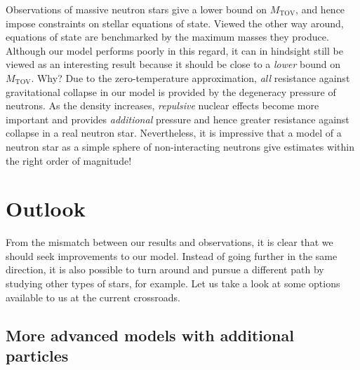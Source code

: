 Observations of massive neutron stars give a lower bound on $M_\text{TOV}$, and hence impose constraints on stellar equations of state.
Viewed the other way around, equations of state are benchmarked by the maximum masses they produce.
Although our model performs poorly in this regard, it can in hindsight still be viewed as an interesting result because it should be close to a \emph{lower} bound on $M_\text{TOV}$.
Why?
Due to the zero-temperature approximation, \emph{all} resistance against gravitational collapse in our model is provided by the degeneracy pressure of neutrons.
As the density increases, \emph{repulsive} nuclear effects become more important and provides \emph{additional} pressure and hence greater resistance against collapse in a real neutron star. \cite[section 3.9.8]{ref:glendenning}
Nevertheless, it is impressive that a model of a neutron star as a simple sphere of non-interacting neutrons give estimates within the right order of magnitude!

\section{Outlook}

From the mismatch between our results and observations, it is clear that we should seek improvements to our model.
Instead of going further in the same direction, it is also possible to turn around and pursue a different path by studying other types of stars, for example.
Let us take a look at some options available to us at the current crossroads.

\subsection*{More advanced models with additional particles}


